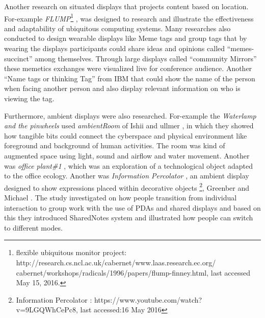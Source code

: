Another research on situated displays that projects content based on location. For-example  \emph{FLUMP}\footnote{flexible ubiquitous monitor project: http://research.cs.ncl.ac.uk/cabernet/www.laas.research.ec.org/ \\ cabernet/workshops/radicals/1996/papers/flump-finney.html, last accessed May 15, 2016.} \cite{flump}, was designed to research and illustrate the effectiveness and adaptability of ubiquitous computing systems. Many researches also conducted to design wearable displays like Meme tags and group tags \cite{meme-tags} that by wearing the displays participants could share ideas and opinions called “memes-succinct” among themselves. Through large displays called “community Mirrors” these memetics exchanges were visualized live for conference audience. Another “Name tags or thinking Tag” from IBM \cite{ibmtags} that could show the name of the person when facing another person and also display relevant information on who is viewing the tag.

Furthermore, ambient displays were also researched. For-example the \emph{Waterlamp and the pinwheels} used \emph{ambientRoom} of Ishii and ullmer \cite{ambient}, in which they showed how tangible bits could connect the cyberspace and physical environment like foreground and background of human activities. The room was kind of augmented space using light, sound and airflow and water movement. Another was \emph{office plant\#1} \cite{office_plant}, which was an exploration of a technological object adapted to the office ecology. Another was \emph{Information Percolator} \cite{information_precolator}, an ambient display designed to show expressions placed within decorative objects \footnote{Information Percolator : https://www.youtube.com/watch?v=9LGQWhCePc8, last accessed:16 May 2016},  Greenber and Michael \cite{shared_notes}. The study investigated on how people transition from individual interaction to group work with the use of PDAs and shared displays and based on this they introduced SharedNotes system and illustrated how people can switch to different modes.

